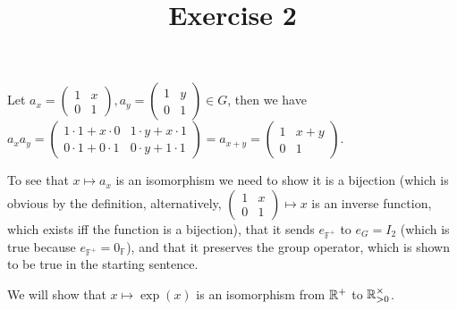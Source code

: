 

\usepackage{skak}
\usepackage{relsize}
\usepackage{graphicx}
\usepackage{mathtools}

\usepackage{textcomp}
\usepackage{bbding}

\usepackage{soul}

\newcommand{\flower}{\text{\scalebox{0.75}{\raisebox{-0.7ex}{
				\rotatebox{90}{\textleaf}\hspace{-0.3em}
				\scalebox{0.7}{\textleaf}\hspace{-1.35em}
				\raisebox{1ex}{\scalebox{0.8}{\FiveFlowerOpen}}
}}}}
\title{Exercise 2}

\maketitle
\begin{cExercise}[][][author][1]
	\begin{cPart}
		Let $a_x=\begin{pmatrix}
			1 & x\\
			0 & 1
		\end{pmatrix}, a_y=\begin{pmatrix}
			1 & y\\
			0 & 1
		\end{pmatrix}\in G$, then we have $a_xa_y=\begin{pmatrix}
			1\cdot 1+x\cdot 0 & 1\cdot y + x\cdot 1\\
			0\cdot 1+0\cdot 1 & 0\cdot y + 1\cdot 1
		\end{pmatrix}=a_{x+y}=\begin{pmatrix}
			1 & x+y\\
			0 & 1
		\end{pmatrix}$.
		
		To see that $x\mapsto a_x$ is an isomorphism we need to show it is a bijection (which is obvious by the definition, alternatively, $\begin{pmatrix}
			1 & x\\
			0 & 1
		\end{pmatrix}\mapsto x$ is an inverse function, which exists iff the function is a bijection), that it sends $e_{\mathbb F^+}$ to $e_G=I_2$ (which is true because $e_{\mathbb F^+}=0_{\mathbb F}$), and that it preserves the group operator, which is shown to be true in the starting sentence.
	\end{cPart}
	\begin{cPart}
		We will show that $x\mapsto \exp(x)$ is an isomorphism from $\mathbb R^+$ to $\mathbb R_{>0}^\times$.
		

\end{cPart}
\end{cExercise}
